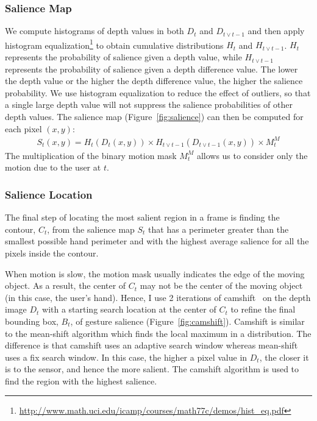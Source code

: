 \subsubsection{Salience Map}
We compute histograms of depth values in both $D_t$ and $D_{t\vee t-1}$ and then
apply histogram
equalization\footnote{\url{http://www.math.uci.edu/icamp/courses/math77c/demos/hist_eq.pdf}}
to obtain cumulative distributions $H_t$ and $H_{t\vee t-1}$.
$H_t$ represents the probability of salience given a depth value, while $H_{t\vee t-1}$ represents the probability of salience given
a depth difference value. The lower the depth value or the higher the depth difference value, the higher the salience probability. We use
histogram equalization to reduce the effect of outliers, so that a single large depth value will not suppress the salience probabilities of other depth values.
The salience map (Figure~\ref{fig:salience}) can then be computed for each pixel $(x, y)$:
\begin{align*}
S_t(x, y) = H_t(D_t(x, y)) \times H_{t\vee t-1}(D_{t\vee t-1}(x, y)) \times M_t^M
\end{align*}
The multiplication of the binary motion mask $M_t^M$ allows us to consider only the motion due to the user at $t$.

\subsubsection{Salience Location}
The final step of locating the most salient region in a frame is finding the
contour, $C_t$, from the salience map $S_t$ that has a perimeter greater than
the smallest possible hand perimeter and with the highest average salience for all the pixels inside the contour.

When motion is slow, the motion mask usually indicates the edge of the moving
object. As a result, the center of $C_t$ may not be the center of the moving
object (in this case, the user's hand). Hence, I use 2 iterations of
camshift~\cite{bradski98} on the depth image $D_t$ with a starting search
location at the center of $C_t$ to refine the final bounding box, $B_t$, of gesture salience (Figure~\ref{fig:camshift}).
Camshift is similar to the mean-shift algorithm which finds the local maximum in
a distribution. The difference is that camshift uses an adaptive search window
whereas mean-shift uses a fix search window. In this case, the higher a pixel
value in $D_t$, the closer it is to the sensor, and hence the more salient.
The camshift algorithm is used to find the region with the highest salience.

